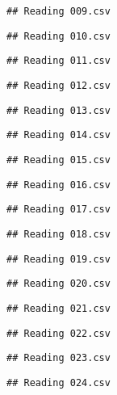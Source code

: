 \documentclass[
]{article}
\begin{document}
\begin{verbatim}
## Reading 009.csv
\end{verbatim}

\begin{verbatim}
## Reading 010.csv
\end{verbatim}

\begin{verbatim}
## Reading 011.csv
\end{verbatim}

\begin{verbatim}
## Reading 012.csv
\end{verbatim}

\begin{verbatim}
## Reading 013.csv
\end{verbatim}

\begin{verbatim}
## Reading 014.csv
\end{verbatim}

\begin{verbatim}
## Reading 015.csv
\end{verbatim}

\begin{verbatim}
## Reading 016.csv
\end{verbatim}

\begin{verbatim}
## Reading 017.csv
\end{verbatim}

\begin{verbatim}
## Reading 018.csv
\end{verbatim}

\begin{verbatim}
## Reading 019.csv
\end{verbatim}

\begin{verbatim}
## Reading 020.csv
\end{verbatim}

\begin{verbatim}
## Reading 021.csv
\end{verbatim}

\begin{verbatim}
## Reading 022.csv
\end{verbatim}

\begin{verbatim}
## Reading 023.csv
\end{verbatim}

\begin{verbatim}
## Reading 024.csv
\end{verbatim}
\end{document}

